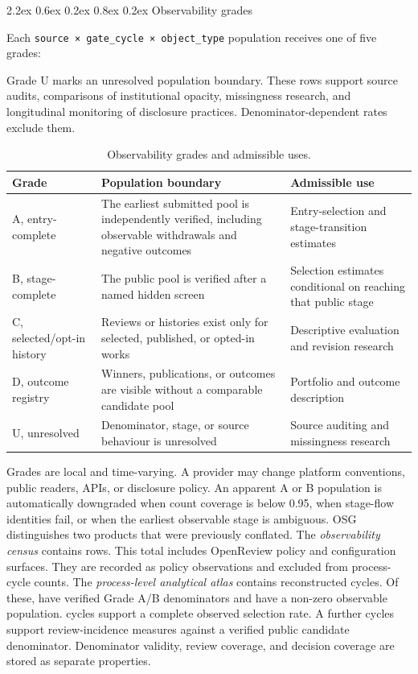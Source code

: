\documentclass[
  10pt,
]{article}
\makeatletter
\renewcommand\subsection{\@startsection{subsection}{2}{\z@}%
  {2.2ex \@plus 0.6ex \@minus 0.2ex}%
  {0.8ex \@plus 0.2ex}%
  {\normalfont\large\sffamily\bfseries\color{OSGInk}}}
\makeatother
\begin{document}
\subsection{Observability grades}\label{22-observability-grades}

Each \texttt{source\ ×\ gate\_cycle\ ×\ object\_type} population
receives one of five grades:

Grade U marks an unresolved population boundary. These rows support
source audits, comparisons of institutional opacity, missingness
research, and longitudinal monitoring of disclosure practices.
Denominator-dependent rates exclude them.

{\small
\begin{longtable}[]{@{}L{0.18\textwidth}L{0.42\textwidth}L{0.32\textwidth}@{}}
\caption{Observability grades and admissible uses.}\label{tab:observability}\\
\toprule\noalign{}
Grade & Population boundary & Admissible use \\
\midrule\noalign{}
\endhead
\bottomrule\noalign{}
\endlastfoot
A, entry-complete & The earliest submitted pool is independently
verified, including observable withdrawals and negative outcomes &
Entry-selection and stage-transition estimates \\
B, stage-complete & The public pool is verified after a named hidden
screen & Selection estimates conditional on reaching that public
stage \\
C, selected/opt-in history & Reviews or histories exist only for
selected, published, or opted-in works & Descriptive evaluation and
revision research \\
D, outcome registry & Winners, publications, or outcomes are visible
without a comparable candidate pool & Portfolio and outcome
description \\
U, unresolved & Denominator, stage, or source behaviour is unresolved &
Source auditing and missingness research \\
\end{longtable}
}

Grades are local and time-varying. A provider may change platform
conventions, public readers, APIs, or disclosure policy. An apparent A
or B population is automatically downgraded when count coverage is below
0.95, when stage-flow identities fail, or when the earliest observable
stage is ambiguous. OSG distinguishes two products that were previously
conflated. The \emph{observability census} contains
\OSGClaimObservabilityCensusCycles{} rows. This total includes
\OSGClaimPolicySurfaceCycles{} OpenReview policy and configuration
surfaces. They are recorded as policy observations and excluded from
process-cycle counts. The \emph{process-level
analytical atlas} contains \OSGClaimPublicationGateCycles{} reconstructed
cycles. Of these, \OSGClaimAdmissibleRateCycles{} have verified Grade A/B
denominators and \OSGClaimPopulatedAdmissibleCycles{} have a non-zero
observable population. \OSGClaimSelectionRateCycles{} cycles support a
complete observed selection rate. A further \OSGClaimReviewRateCycles{} cycles
support review-incidence measures against a verified public candidate
denominator. Denominator validity, review coverage, and decision coverage
are stored as separate properties.
\end{document}
